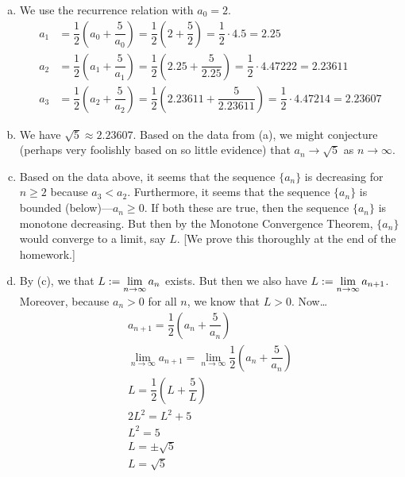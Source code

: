 \documentclass[11pt,letterpaper]{article}
\begin{document}
\sol 
\begin{enumerate}[(a)]
\item We use the recurrence relation with $a_0= 2$. 
	\[
	\begin{aligned}
	a_1&= \dfrac{1}{2} \left( a_0 + \dfrac{5}{a_0} \right)= \dfrac{1}{2} \left( 2 + \dfrac{5}{2} \right)= \dfrac{1}{2} \cdot 4.5= 2.25 \\
	a_2&= \dfrac{1}{2} \left( a_1 + \dfrac{5}{a_1} \right)= \dfrac{1}{2} \left(2.25 + \dfrac{5}{2.25} \right)= \dfrac{1}{2} \cdot 4.47222= 2.23611 \\
	a_3&= \dfrac{1}{2} \left( a_2 + \dfrac{5}{a_2} \right)= \dfrac{1}{2} \left( 2.23611 + \dfrac{5}{2.23611} \right)= \dfrac{1}{2} \cdot 4.47214= 2.23607
	\end{aligned}
	\] 

\item We have $\sqrt{5} \approx 2.23607$. Based on the data from (a), we might conjecture (perhaps very foolishly based on so little evidence) that $a_n \to \sqrt{5}$ as $n \to \infty$. 

\item Based on the data above, it seems that the sequence $\{ a_n \}$ is decreasing for $n \geq 2$ because $a_3 < a_2$. Furthermore, it seems that the sequence $\{ a_n \}$ is bounded (below)---$a_n \geq 0$. If both these are true, then the sequence $\{ a_n \}$ is monotone decreasing. But then by the Monotone Convergence Theorem, $\{ a_n \}$ would converge to a limit, say $L$. [We prove this thoroughly at the end of the homework.]

\item By (c), we that $L:= \displaystyle \lim_{n \to \infty} a_n$ exists. But then we also have $L:= \displaystyle \lim_{n \to \infty} a_{n + 1}$. Moreover, because $a_n > 0$ for all $n$, we know that $L > 0$. Now\dots
	\[
	\begin{gathered}
	a_{n+1}= \dfrac{1}{2} \left( a_n + \dfrac{5}{a_n} \right) \\
	\lim_{n \to \infty} a_{n+1}= \lim_{n \to \infty} \dfrac{1}{2} \left( a_n + \dfrac{5}{a_n} \right) \\
	L= \dfrac{1}{2} \left(L + \dfrac{5}{L} \right) \\
	2L^2= L^2 + 5 \\
	L^2= 5 \\
	L= \pm \sqrt{5} \\
	L= \sqrt{5}
	\end{gathered}
	\]
\end{enumerate}
\end{document}
